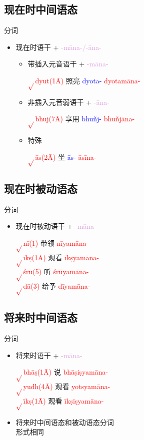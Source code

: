 \documentclass[17pt]{beamer}
\newcommand{\verbroot}[1]{\textcolor{red}{$\sqrt{}$#1}}
\newcommand{\nounstem}[1]{\textcolor{red}{#1\nobreakdash-}}
\newcommand{\verbstem}[1]{\textcolor{blue}{#1\nobreakdash-}}
\newcommand{\pratyaya}[1]{\textcolor{Plum}{#1}}
\begin{document}
\subsection{现在时中间语态}
\begin{frame}{\insertsubsection 分词}
  \begin{itemize}
    \item 现在时语干 + \pratyaya{\nobreakdash-māna\nobreakdash-/\nobreakdash-āna\nobreakdash-}  
    \begin{itemize}
      \item 带插入元音语干 + \pratyaya{\nobreakdash-māna\nobreakdash-}  
      
      \verbroot{dyut(1Ā)} 照亮 \verbstem{dyota} \nounstem{dyotamāna}
      \item 非插入元音弱语干 + \pratyaya{\nobreakdash-āna\nobreakdash-}
      
      \verbroot{bhuj(7Ā)} 享用 \verbstem{bhuñj} \nounstem{bhuñjāna}
      \item 特殊
      
      \verbroot{ās(2Ā)} 坐 \verbstem{ās} \nounstem{āsīna}
    \end{itemize}
  \end{itemize}
\end{frame}

\subsection{现在时被动语态}
\begin{frame}{\insertsubsection 分词}
  \begin{itemize}
    \item 现在时被动语干 + \pratyaya{\nobreakdash-māna\nobreakdash-}  

    \verbroot{nī(1)} 带领 \nounstem{nīyamāna}\\
    \verbroot{īkṣ(1Ā)} 观看 \nounstem{īkṣyamāna}\\
    \verbroot{śru(5)} 听 \nounstem{śrūyamāna}\\
    \verbroot{dā(3)} 给予 \nounstem{dīyamāna}
  \end{itemize}
\end{frame}

\subsection{将来时中间语态}
\begin{frame}{\insertsubsection 分词}
  \begin{itemize}
    \item 将来时语干 + \pratyaya{\nobreakdash-māna\nobreakdash-}  

    \verbroot{bhāṣ(1Ā)} 说 \nounstem{bhāṣiṣyamāna}\\
    \verbroot{yudh(4Ā)} 观看 \nounstem{yotsyamāna}\\
    \verbroot{īkṣ(1Ā)} 观看 \nounstem{īkṣiṣyamāna}

    \item 将来时中间语态和被动语态分词\\形式相同
  \end{itemize}
\end{frame}
\end{document}
